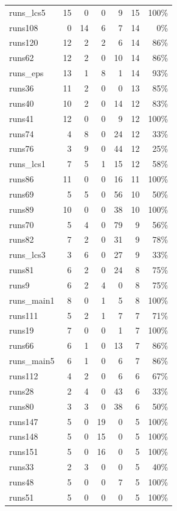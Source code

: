 \begin{longtable}{@{}lrrrrrr@{}}
runs\_lcs5 & 15 & 0 & 0 & 9 & 15 & 100\% \\
runs108 & 0 & 14 & 6 & 7 & 14 & 0\% \\
runs120 & 12 & 2 & 2 & 6 & 14 & 86\% \\
runs62 & 12 & 2 & 0 & 10 & 14 & 86\% \\
runs\_eps & 13 & 1 & 8 & 1 & 14 & 93\% \\
runs36 & 11 & 2 & 0 & 0 & 13 & 85\% \\
runs40 & 10 & 2 & 0 & 14 & 12 & 83\% \\
runs41 & 12 & 0 & 0 & 9 & 12 & 100\% \\
runs74 & 4 & 8 & 0 & 24 & 12 & 33\% \\
runs76 & 3 & 9 & 0 & 44 & 12 & 25\% \\
runs\_lcs1 & 7 & 5 & 1 & 15 & 12 & 58\% \\
runs86 & 11 & 0 & 0 & 16 & 11 & 100\% \\
runs69 & 5 & 5 & 0 & 56 & 10 & 50\% \\
runs89 & 10 & 0 & 0 & 38 & 10 & 100\% \\
runs70 & 5 & 4 & 0 & 79 & 9 & 56\% \\
runs82 & 7 & 2 & 0 & 31 & 9 & 78\% \\
runs\_lcs3 & 3 & 6 & 0 & 27 & 9 & 33\% \\
runs81 & 6 & 2 & 0 & 24 & 8 & 75\% \\
runs9 & 6 & 2 & 4 & 0 & 8 & 75\% \\
runs\_main1 & 8 & 0 & 1 & 5 & 8 & 100\% \\
runs111 & 5 & 2 & 1 & 7 & 7 & 71\% \\
runs19 & 7 & 0 & 0 & 1 & 7 & 100\% \\
runs66 & 6 & 1 & 0 & 13 & 7 & 86\% \\
runs\_main5 & 6 & 1 & 0 & 6 & 7 & 86\% \\
runs112 & 4 & 2 & 0 & 6 & 6 & 67\% \\
runs28 & 2 & 4 & 0 & 43 & 6 & 33\% \\
runs80 & 3 & 3 & 0 & 38 & 6 & 50\% \\
runs147 & 5 & 0 & 19 & 0 & 5 & 100\% \\
runs148 & 5 & 0 & 15 & 0 & 5 & 100\% \\
runs151 & 5 & 0 & 16 & 0 & 5 & 100\% \\
runs33 & 2 & 3 & 0 & 0 & 5 & 40\% \\
runs48 & 5 & 0 & 0 & 7 & 5 & 100\% \\
runs51 & 5 & 0 & 0 & 0 & 5 & 100\% \\

\end{longtable}

